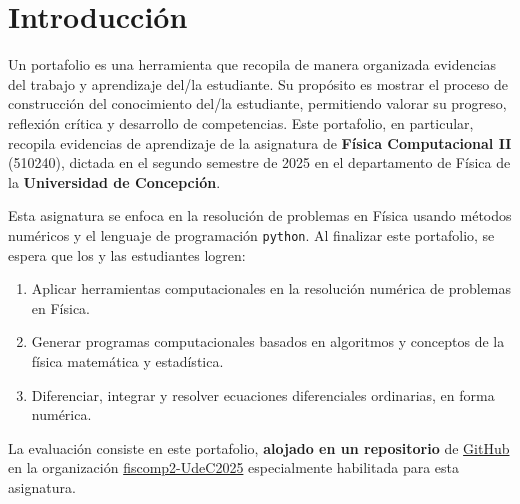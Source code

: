 \documentclass[../portafolio.tex]{subfiles}
\begin{document}

\chapter*{Introducción}

Un portafolio es una herramienta que recopila de manera organizada
evidencias del trabajo y aprendizaje del/la estudiante. Su propósito
es mostrar el proceso de construcción del conocimiento del/la
estudiante, permitiendo valorar su progreso, reflexión crítica y
desarrollo de competencias. Este portafolio, en particular, recopila
evidencias de aprendizaje de la asignatura de \textbf{Física
  Computacional II} (510240), dictada en el segundo semestre de 2025
en el departamento de Física de la \textbf{Universidad de Concepción}.

\medskip

Esta asignatura se enfoca en la resolución de problemas en Física
usando métodos numéricos y el lenguaje de programación
\texttt{python}. Al finalizar este portafolio, se espera que los y las
estudiantes logren:
\begin{enumerate}
\item Aplicar herramientas computacionales en la resolución
  numérica de problemas en Física.
\item Generar programas computacionales basados en algoritmos y
  conceptos de la física matemática y estadística.
\item Diferenciar, integrar y resolver ecuaciones diferenciales
  ordinarias, en forma numérica.
\end{enumerate}

\medskip

La evaluación consiste en este portafolio, \textbf{alojado en un repositorio} de
\href{https://github.com}{GitHub} en la organización
\href{https://github.com/fiscomp2-UdeC2025}{fiscomp2-UdeC2025}
especialmente habilitada para esta asignatura.
\end{document}
